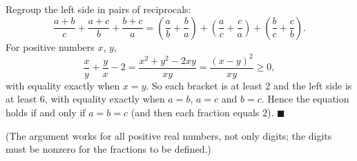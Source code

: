 Regroup the left side in pairs of reciprocals:
\[
\dfrac{a+b}{c}+\dfrac{a+c}{b}+\dfrac{b+c}{a}=\left(\dfrac {a}{b}+\dfrac {b}{a}\right)+\left(\dfrac {a}{c}+\dfrac {c}{a}\right)+\left(\dfrac {b}{c}+\dfrac {c}{b}\right).
\]
For positive numbers $x$, $y$,
\[
\dfrac {x}{y}+\dfrac {y}{x}-2=\dfrac{x^2+y^2-2xy}{xy}=\dfrac{(x-y)^2}{xy}\ge0 ,
\]
with equality exactly when $x=y$. So each bracket is at least $2$ and the left side is at least $6$, with equality exactly when $a=b$, $a=c$ and $b=c$. Hence the equation holds if and only if $a=b=c$ (and then each fraction equals $2$). $\blacksquare$

(The argument works for all positive real numbers, not only digits; the digits must be nonzero for the fractions to be defined.)
